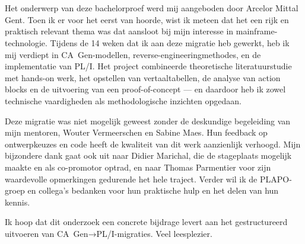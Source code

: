 
\chapter*{}%
\label{ch:voorwoord}


Het onderwerp van deze bachelorproef werd mij aangeboden door Arcelor Mittal Gent. Toen ik er voor het eerst van hoorde, wist ik meteen dat het een rijk en praktisch relevant thema was dat aansloot bij mijn interesse in mainframe-technologie. Tijdens de 14 weken dat ik aan deze migratie heb gewerkt, heb ik mij verdiept in CA~Gen-modellen, reverse-engineeringmethodes, en de implementatie van PL/I. Het project combineerde theoretische literatuurstudie met hands-on werk, het opstellen van vertaaltabellen, de analyse van action blocks en de uitvoering van een proof-of-concept — en daardoor heb ik zowel technische vaardigheden als methodologische inzichten opgedaan.

Deze migratie was niet mogelijk geweest zonder de deskundige begeleiding van mijn mentoren, Wouter Vermeerschen en Sabine Maes. Hun feedback op ontwerpkeuzes en code heeft de kwaliteit van dit werk aanzienlijk verhoogd. Mijn bijzondere dank gaat ook uit naar Didier Marichal, die de stageplaats mogelijk maakte en als co-promotor optrad, en naar Thomas Parmentier voor zijn waardevolle opmerkingen gedurende het hele traject. Verder wil ik de PLAPO-groep en collega’s bedanken voor hun praktische hulp en het delen van hun kennis.

Ik hoop dat dit onderzoek een concrete bijdrage levert aan het gestructureerd uitvoeren van CA~Gen→PL/I-migraties. Veel leesplezier.